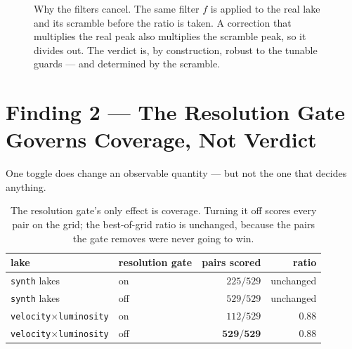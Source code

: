 \documentclass[11pt, letterpaper, openany]{book}
\begin{document}
\begin{figure}[H]
\centering
{}
\caption{Why the filters cancel. The same filter $f$ is applied to the real lake and its scramble before
the ratio is taken. A correction that multiplies the real peak also multiplies the scramble peak, so it
divides out. The verdict is, by construction, robust to the tunable guards --- and determined by the
scramble.}
\end{figure}

\section{Finding 2 --- The Resolution Gate Governs Coverage, Not Verdict}

One toggle does change an observable quantity --- but not the one that decides anything.

\begin{table}[H]
\centering
\small
\begin{tabular}{@{}llrr@{}}
\toprule
\textbf{lake} & \textbf{resolution gate} & \textbf{pairs scored} & \textbf{ratio} \\
\midrule
\texttt{synth} lakes      & on  & $225/529$ & unchanged \\
\texttt{synth} lakes      & off & $529/529$ & unchanged \\
\texttt{velocity$\times$luminosity} & on  & $112/529$ & $0.88$ \\
\texttt{velocity$\times$luminosity} & off & $\mathbf{529/529}$ & $\mathbf{0.88}$ \\
\bottomrule
\end{tabular}
\caption{The resolution gate's only effect is coverage. Turning it off scores every pair on the grid;
the best-of-grid ratio is unchanged, because the pairs the gate removes were never going to win.}
\end{table}
\end{document}
